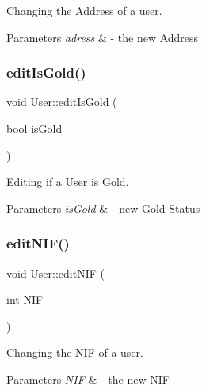 Changing the Address of a user. 


\begin{DoxyParams}{Parameters}
{\em adress} & -\/ the new Address \\
\hline
\end{DoxyParams}
\mbox{\label{class_user_a092c80f086767a8c204320b6517bfc58}} 
\subsubsection{\texorpdfstring{edit\+Is\+Gold()}{editIsGold()}}
{\footnotesize\ttfamily void User\+::edit\+Is\+Gold (\begin{DoxyParamCaption}\item[{bool}]{is\+Gold }\end{DoxyParamCaption})}



Editing if a \mbox{\hyperlink{class_user}{User}} is Gold. 


\begin{DoxyParams}{Parameters}
{\em is\+Gold} & -\/ new Gold Status \\
\hline
\end{DoxyParams}
\mbox{\label{class_user_a470738d77c8d53ab5c41cdcd74497a82}} 
\subsubsection{\texorpdfstring{edit\+N\+I\+F()}{editNIF()}}
{\footnotesize\ttfamily void User\+::edit\+N\+IF (\begin{DoxyParamCaption}\item[{int}]{N\+IF }\end{DoxyParamCaption})}



Changing the N\+IF of a user. 


\begin{DoxyParams}{Parameters}
{\em N\+IF} & -\/ the new N\+IF \\
\hline
\end{DoxyParams}
\mbox{\label{class_user_a0f8f72211ae7a56e413ad70358f96a19}} 
